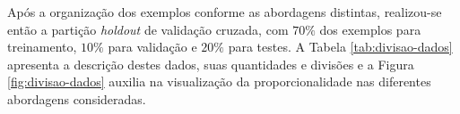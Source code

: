 Após a organização dos exemplos conforme as abordagens distintas, realizou-se então a partição \emph{holdout} de validação cruzada, com $70\%$ dos exemplos para treinamento, $10\%$ para validação e $20\%$ para testes. A Tabela \ref{tab:divisao-dados} apresenta a descrição destes dados, suas quantidades e divisões e a Figura \ref{fig:divisao-dados} auxilia na visualização da proporcionalidade nas diferentes abordagens consideradas.

\begin{table}[h!]
	\centering
	\caption{Quantitativo de exemplos por abordagem, classe e finalidade na tarefa de aprendizado considerada.}
	\label{tab:divisao-dados}
\end{table}


